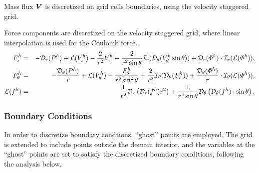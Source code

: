 Mass flux $\boldsymbol{V}$ is discretized on grid cells boundaries, 
using the velocity staggered grid.

Force components are discretized on the velocity staggered grid, where
linear interpolation is used for the Coulomb force.
\begin{eqnarray}
F^h_r &=& -\mathcal{D}_r(P^h) 
          + \mathcal{L}(V^h_r) - \frac{2}{r^2} V^h_r 
		  - \frac{2}{r^2 \sin\theta} \mathcal{I}_r(\mathcal{D}_\theta (V^h_\theta \sin\theta))
          + \mathcal{D}_r(\varPhi^h) \cdot \mathcal{I}_r(\mathcal{L}(\varPhi^h)), \\
F^h_\theta &=& -\frac{\mathcal{D}_\theta(P^h)}{r} 
		  + \mathcal{L}(V^h_\theta) - \frac{F^h_\theta}{r^2 \sin^2\theta} 
		  + \frac{2}{r^2} \mathcal{I}_\theta(\mathcal{D}_\theta(F^h_r))
		  + \frac{\mathcal{D}_\theta(\varPhi^h)}{r} \cdot \mathcal{I}_\theta(\mathcal{L}(\varPhi^h)), \\
\mathcal{L}(f^h) &=& \frac{1}{r^2}\mathcal{D}_r\left(\mathcal{D}_r(f^h) r^2\right) + 
\frac{1}{r^2 \sin\theta} \mathcal{D}_\theta\left(\mathcal{D}_\theta(f^h) \cdot \sin\theta\right).
\end{eqnarray}


\subsubsection{Boundary Conditions}
In order to discretize boundary condtions, 
``ghost'' points are employed. 
The grid is extended to include points outside the domain interior,
and the variables at the ``ghost'' points are set to satisfy 
the discretized boundary conditions, following the analysis below.

